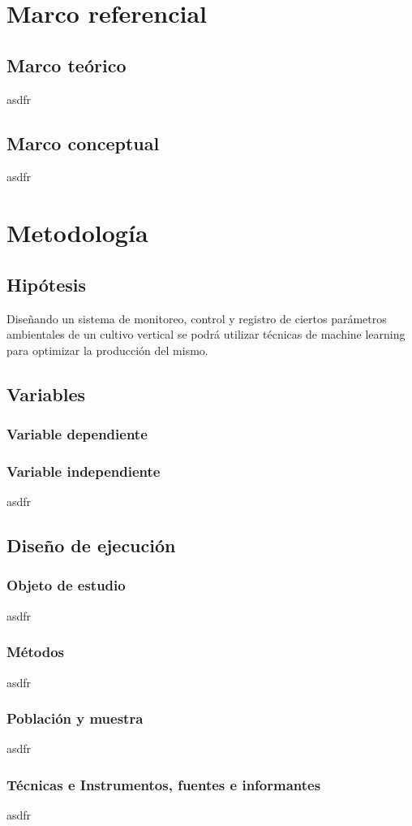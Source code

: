 \documentclass{report}
\begin{document}
\chapter{Marco referencial}
\section{Marco teórico}
asdfr
\section{Marco conceptual}
asdfr
\chapter{Metodología}
\section{Hipótesis}
Diseñando un sistema de monitoreo, control y registro de ciertos parámetros
ambientales de un cultivo vertical se podrá utilizar técnicas de machine
learning para optimizar la producción del mismo.
\section{Variables}
\subsection{Variable dependiente}

\subsection{Variable independiente}
asdfr
\section{Diseño de ejecución}
\subsection{Objeto de estudio}
asdfr
\subsection{Métodos}
asdfr
\subsection{Población y muestra}
asdfr
\subsection{Técnicas e Instrumentos, fuentes e informantes}
asdfr
\end{document}
